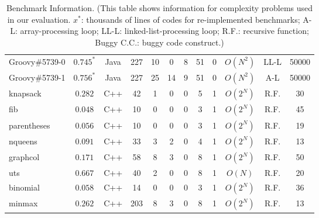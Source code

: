 \begin{table*}[h!]
{\begin{tabular}{lccccccccccc}
    \midrule
    Groovy\#5739-0        & $0.745^*$  & Java  & 227 & 10 & 0 & 8 & 51 & 0                                                & $O(N^{2})$ & LL-L& 50000 \\
    Groovy\#5739-1        & $0.756^*$  & Java  &227  & 25 &  14 & 9 & 51 & 0                                              & $O(N^{2})$ & A-L & 50000 \\
    \midrule
    \midrule
    knapsack      &  $0.282$  & C++  & 42 & 1 & 0 & 0 & 5 & 1                                                                            & $O(2^{N})$ & R.F. & 30  \\
    fib      &  $0.048$ & C++  & 10 & 0 & 0 & 0 & 3 & 1                                                                                  & $O(2^{N})$ & R.F. & 45 \\
    parentheses      & $0.056$   & C++  & 10 & 0 & 0 & 0 & 3 & 1                                                                         & $O(2^{N})$ & R.F. & 19 \\
    nqueens      & $0.091$  & C++  & 33 & 3 & 2 & 0 & 4 & 1                                                                              & $O(2^{N})$ & R.F. & 13 \\
    graphcol      &  $0.171$  & C++  & 58 & 8 & 3 & 0 & 8 & 1                                                                            & $O(2^{N})$ & R.F. & 50 \\
    uts      &  $0.667$  & C++  & 40  & 2 & 0 & 0 & 8 & 1                                                                                & $O(N)$     & R.F. & 20 \\
    binomial      &  $0.058$  & C++  & 14 & 0 & 0 & 0 & 3 & 1                                                                            & $O(2^{N})$ & R.F. & 36 \\
    minmax      &  $0.262$  & C++  & 203 & 8 & 3 & 0 & 8 & 1                                                                             & $O(2^{N})$ & R.F. & 13 \\


    \bottomrule
   \end{tabular}
   }
  \caption{Benchmark Information.
  \footnotesize{(This table shows information for complexity problems used in our evaluation.
   $x^*$: thousands of lines of codes for re-implemented benchmarks;
   A-L: array-processing loop;
   LL-L: linked-list-processing loop;
   R.F.: recursive function;
   Buggy C.C.: buggy code construct.)}}
  \label{tab:benchmark_info}
\end{table*}
